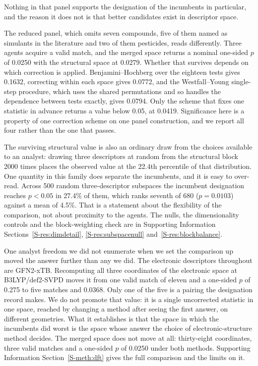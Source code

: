 \documentclass[journal=jacsat,manuscript=article,margin=1in]{achemso}
\begin{document}
Nothing in that panel supports the designation of the incumbents in
particular, and the reason it does not is that better candidates exist in
descriptor space.

The reduced panel, which omits seven compounds, five of them named as
simulants in the literature and two of them pesticides, reads differently. Three agents acquire a valid match, and the
merged space returns a nominal one-sided $p$ of 0.0250 with the structural
space at 0.0279. Whether that survives depends on which correction is
applied. Benjamini--Hochberg over the eighteen tests gives 0.1632,
correcting within each space gives 0.0772, and the Westfall--Young
single-step procedure, which uses the shared permutations and so handles
the dependence between tests exactly, gives 0.0794. Only the scheme that
fixes one statistic in advance returns a value below 0.05, at 0.0419.
Significance here is a property of one correction scheme on one panel
construction, and we report all four rather than the one that passes.

The surviving structural value is also an ordinary draw from the choices
available to an analyst: drawing three descriptors at random from the
structural block 2000 times places the observed value at the 22.4th
percentile of that distribution. One quantity in this family does separate the
incumbents, and it is easy to over-read. Across 500 random three-descriptor
subspaces the incumbent designation reaches $p<0.05$ in 27.4\% of them, which
ranks seventh of 680 ($p=0.0103$) against a mean of 4.5\%. That is a
statement about the flexibility of the comparison, not about proximity to the
agents. The nulls, the dimensionality controls and the block-weighting check
are in Supporting Information Sections~\ref{S-res:dimdetail},
\ref{S-res:subspacenull} and~\ref{S-res:blockbalance}.

One analyst freedom we did not enumerate when we set the comparison up moved
the answer further than any we did. The electronic descriptors throughout are
GFN2-xTB. Recomputing all three coordinates of the electronic space at
B3LYP/def2-SVPD moves it from one valid match of eleven and a one-sided $p$ of
0.275 to five matches and 0.0368. Only one of the five is a pairing the
designation record makes. We do not promote that value: it is a single
uncorrected statistic in one space, reached by changing a method after seeing
the first answer, on different geometries. What it establishes is that the
space in which the incumbents did worst is the space whose answer the choice
of electronic-structure method decides. The merged space does not move at all: thirty-eight
coordinates, three valid matches and a one-sided $p$ of 0.0250 under both
methods. Supporting Information Section~\ref{S-meth:dft} gives the full
comparison and the limits on it.
\end{document}
